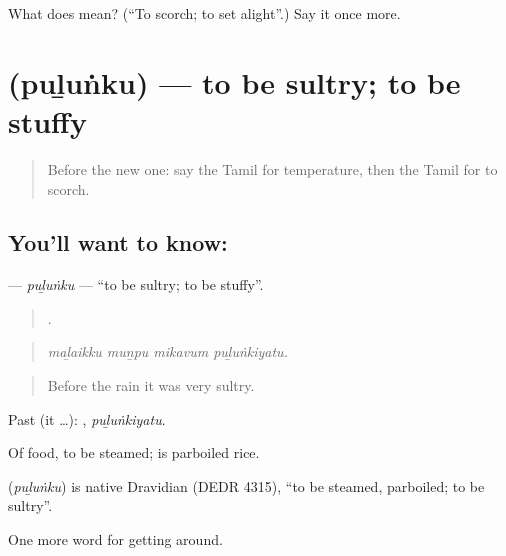 \begin{tcolorbox}[breakable,colback=teal!4,colframe=teal!35!black,title={Before you move on}]
What does  mean? (\textquotedblleft{}To scorch; to set alight\textquotedblright{}.) Say it once more.
\end{tcolorbox}
\section[\texorpdfstring{\ta{புழுங்கு} (puḻuṅku)}{புழுங்கு (puḻuṅku)}]{ (puḻuṅku) — to be sultry; to be stuffy}

\label{lesson:TA-C427-pulunku}



\begin{quote}
Before the new one: say the Tamil for temperature, then the Tamil for to scorch.
\end{quote}

\subsection*{You'll want to know: }
\textbf{} — \emph{puḻuṅku} — \textquotedblleft{}to be sultry; to be stuffy\textquotedblright{}.

\begin{quote}
   .
\end{quote}

\begin{quote}
\emph{maḻaikku muṉpu mikavum puḻuṅkiyatu.}
\end{quote}

\begin{quote}
Before the rain it was very sultry.
\end{quote}

Past (it …): , \emph{puḻuṅkiyatu}.

Of food, to be steamed;   is parboiled rice.

\begin{cousinweb}
\textbf{} (\emph{puḻuṅku}) is native Dravidian (DEDR 4315), \textquotedblleft{}to be steamed, parboiled; to be sultry\textquotedblright{}.
\end{cousinweb}

\begin{grammarlens}[title={What you've built}]
One more word for getting around.
\end{grammarlens}

